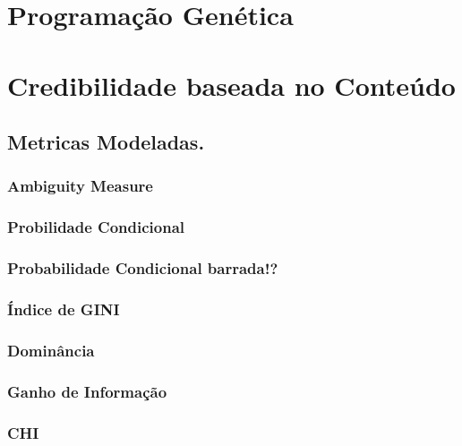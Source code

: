 
\section{Programação Genética}

\section{Credibilidade baseada no Conteúdo}
\label{sec::04_cred_baseada_conteudo}

\subsection{Metricas Modeladas.}
\label{subsec::04_metricas_conteudo}


\subsubsection{Ambiguity Measure}
\label{subsubsection::am}

\subsubsection{Probilidade Condicional}
\label{subsubsection::pc}


\subsubsection{Probabilidade Condicional barrada!?}
\label{subsubsection::pc'}

\subsubsection{Índice de GINI}
\label{subsubsection::gini}

\subsubsection{Dominância}
\label{subsubsection::dom}

\subsubsection{Ganho de Informação}
\label{subsubsection::ig}

\subsubsection{CHI}
\label{subsubsection::chi}


